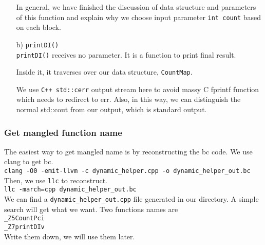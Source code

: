 \documentclass{acm_proc_article-sp}
\begin{document}
\begin{itemize}
In general, we have finished the discussion of data structure and parameters of this function and explain why we choose input parameter {\tt int count} based on each block. 

\item[b)] {\tt printDI() }\\
{\tt printDI()} receives no parameter. It is a function to print final result. 

Inside it, it traverses over our data structure, {\tt CountMap}.

We use {\tt C++ std::cerr} output stream here to avoid massy C fprintf function which needs to redirect to err. Also, in this way, we can distinguish the normal std::cout from our output, which is standard output.
\end{itemize}

\subsubsection{Get mangled function name}
The easiest way to get mangled name is by reconstructing the bc code. We use clang to get bc.\\
{\tt \small clang -O0 -emit-llvm -c dynamic\_helper.cpp -o dynamic\_helper\_out.bc}\\
Then, we use {\tt llc} to reconstruct.\\
{\tt \small llc -march=cpp dynamic\_helper\_out.bc}\\
We can find a {\tt dynamic\_helper\_out.cpp} file generated in our directory.
A simple search will get what we want. Two functions names are\\
{\tt \small \_Z5CountPci}\\
{\tt \small \_Z7printDIv}\\
Write them down, we will use them later.
\end{document}
